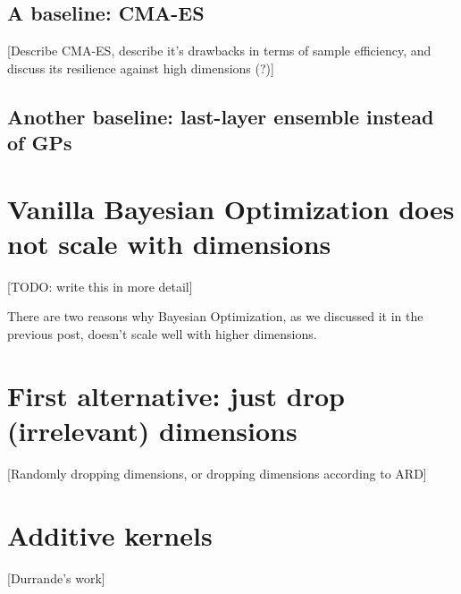 \documentclass{article}
\begin{document}
\subsection*{A baseline: CMA-ES}

[Describe CMA-ES, describe it's drawbacks in terms of sample efficiency, and discuss its resilience against high dimensions (?)]

\subsection*{Another baseline: last-layer ensemble instead of GPs}

\section*{Vanilla Bayesian Optimization does not scale with dimensions}

[TODO: write this in more detail]

There are two reasons why Bayesian Optimization, as we discussed it in the previous post, doesn't scale well with higher dimensions.

\section*{First alternative: just drop (irrelevant) dimensions}

[Randomly dropping dimensions, or dropping dimensions according to ARD]

\section*{Additive kernels}

[Durrande's work]





\end{document}
